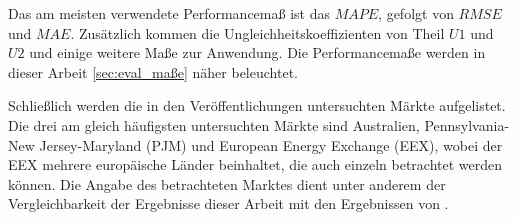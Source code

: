 Das am meisten verwendete Performancemaß ist das $MAPE$, gefolgt von $RMSE$ und $MAE$. Zusätzlich kommen die Ungleichheitskoeffizienten von Theil $U1$ und $U2$ und einige weitere Maße zur Anwendung. Die Performancemaße werden in dieser Arbeit  \autoref{sec:eval_maße} näher beleuchtet.


Schließlich werden die in den Veröffentlichungen untersuchten Märkte aufgelistet. Die drei am gleich häufigsten untersuchten Märkte sind Australien, Pennsylvania-New Jersey-Maryland (\gls{PJM}) und European Energy Exchange (\gls{EEX}), wobei der EEX mehrere europäische Länder beinhaltet, die auch einzeln betrachtet werden können. Die Angabe des betrachteten Marktes dient unter anderem der Vergleichbarkeit der Ergebnisse dieser Arbeit mit den Ergebnissen von \citet{Panapakidis2016}. 











